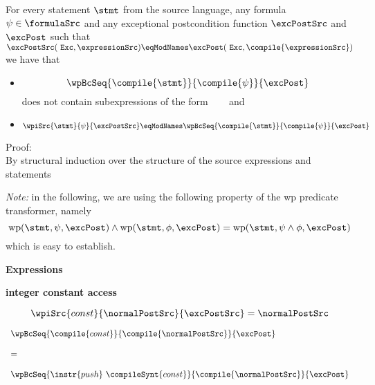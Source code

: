 \begin{pogEquiv}
 
  For every statement $\stmt $ from the source language, any formula $\psi \in \formulaSrc$   and any exceptional postcondition
function $\excPostSrc$ and $\excPost$ such that
 $\excPostSrc ( \mbox{ \rm \texttt{Exc}} , \expressionSrc ) \eqModNames  \excPost ( \mbox{ \rm \texttt{Exc}}  , \compile{\expressionSrc}  ) $ we have that
\begin{itemize}
     \item  $$\wpBcSeq{ \compile{ \stmt}} { \compile{\psi}} {\excPost}$$  does not contain subexpressions of the form 
     \mbox{ \rm ~ } and\mbox{ \rm  \counter } 

     \item  $$\wpiSrc{ \stmt } { \psi} {\excPostSrc} \eqModNames \wpBcSeq{ \compile{ \stmt }} { \compile{\psi}} {\excPost}  $$ 
  
\end{itemize}


Proof: \\
By structural induction over the structure of the source expressions and statements 

\textit{Note:} in the following, we are using the following property  of the \textrm{wp} predicate transformer, namely   
$$\rm{wp}( \stmt, \psi, \excPost) \wedge \rm{wp}( \stmt, \phi, \excPost ) = \rm{wp}( \stmt, \psi \wedge \phi, \excPost )    $$
which is easy to establish.
\begin{description}


\item \textbf{Expressions}

\begin{description}
  \item  \textbf{integer constant access}

  $$\wpiSrc{const}{\normalPostSrc }{ \excPostSrc } = \normalPostSrc $$


\[
\begin{array}{l}
  \wpBcSeq{ \compile{ const}} { \compile{\normalPostSrc }}{ \excPost } \\
  \\
  =  \\
 \\
  \wpBcSeq{\instr{push }\ \compileSynt{const}}{ \compile{\normalPostSrc }}{ \excPost } \\
\end{array}
\]
  

\end{description}
\end{description}
\end{pogEquiv}
